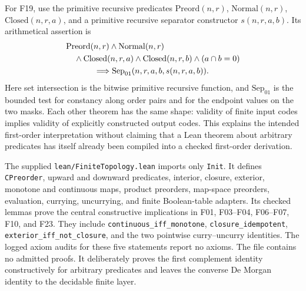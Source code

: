 For F19, use the primitive recursive predicates
$\mathrm{Preord}(n,r)$, $\mathrm{Normal}(n,r)$,
$\mathrm{Closed}(n,r,a)$, and a primitive recursive separator
constructor $s(n,r,a,b)$.  Its arithmetical assertion is
\[
\begin{split}
 &\mathrm{Preord}(n,r)\land\mathrm{Normal}(n,r)\\
 &\quad\land\mathrm{Closed}(n,r,a)\land\mathrm{Closed}(n,r,b)
 \land(a\cap b=0)\\
 &\hspace{12mm}\Longrightarrow
 \mathrm{Sep}_{01}(n,r,a,b,s(n,r,a,b)).
\end{split}
\]
Here set intersection is the bitwise primitive recursive function,
and $\mathrm{Sep}_{01}$ is the bounded test for constancy along
order pairs and for the endpoint values on the two masks.  Each
other theorem has the same shape: validity of finite input codes
implies validity of explicitly constructed output codes.  This
explains the intended first-order interpretation without claiming
that a Lean theorem about arbitrary predicates has itself already
been compiled into a checked first-order derivation.

The supplied \texttt{lean/FiniteTopology.lean} imports only
\texttt{Init}.  It defines \texttt{CPreorder}, upward and downward
predicates, interior, closure, exterior, monotone and continuous
maps, product preorders, map-space preorders, evaluation, currying,
uncurrying, and finite Boolean-table adapters.  Its checked lemmas
prove the central constructive implications in F01, F03--F04,
F06--F07, F10, and F23.  They include
\texttt{continuous\_iff\_monotone},
\texttt{closure\_idempotent},
\texttt{exterior\_iff\_not\_closure}, and the two pointwise
curry--uncurry identities.  The logged axiom audits for these
five statements report no axioms.  The file contains no admitted
proofs.  It deliberately proves the first complement identity
constructively for arbitrary predicates and leaves the converse
De Morgan identity to the decidable finite layer.

